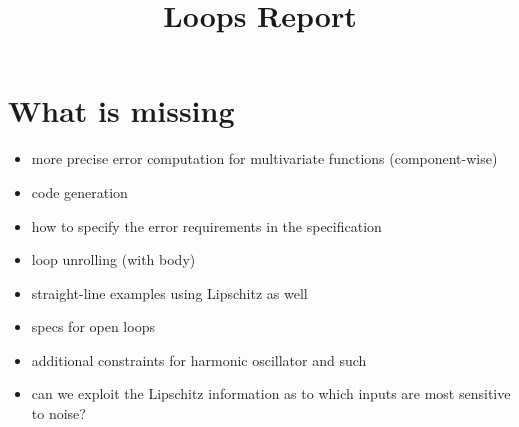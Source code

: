 \documentclass[10pt]{article}
\title{Loops Report}
\author{}
\begin{document}
\maketitle

\section{What is missing}
\begin{itemize}
\item more precise error computation for multivariate functions (component-wise)

\item code generation

\item how to specify the error requirements in the specification

\item loop unrolling (with body)

\item straight-line examples using Lipschitz as well

\item specs for open loops

\item additional constraints for harmonic oscillator and such

\item can we exploit the Lipschitz information as to which
inputs are most sensitive to noise?
\end{itemize}




\end{document}
